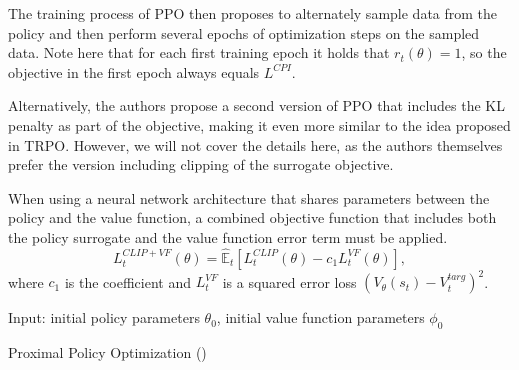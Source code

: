 The training process of PPO then proposes to alternately sample data from the policy and then perform several epochs of optimization steps on the sampled data.
Note here that for each first training epoch it holds that $r_t(\theta) = 1$, so the objective in the first epoch always equals $L^{CPI}$.

Alternatively, the authors propose a second version of PPO that includes the KL penalty as part of the objective, making it even more similar to the idea proposed in TRPO.
However, we will not cover the details here, as the authors themselves prefer the version including clipping of the surrogate objective.

When using a neural network architecture that shares parameters between the policy and the value function, a combined objective function that includes both the policy surrogate and the value function error term must be applied.
\[
  L_t^{CLIP+VF}(\theta) = \hat{\mathbb{E}}_t \left[L_t^{CLIP}(\theta) - c_1 L_t^{VF}(\theta) \right],
\]
where $c_1$ is the coefficient and $L_t^{VF}$ is a squared error loss $(V_\theta(s_t) - V_t^{targ})^2$.
\begin{algorithm}[]
  Input: initial policy parameters $\theta_0$, initial value function parameters $\phi_0$
  
  
  \caption{Proximal Policy Optimization (\cite{SpinningUpIntro})}
  \label{PPOAlgorithm}
\end{algorithm}

